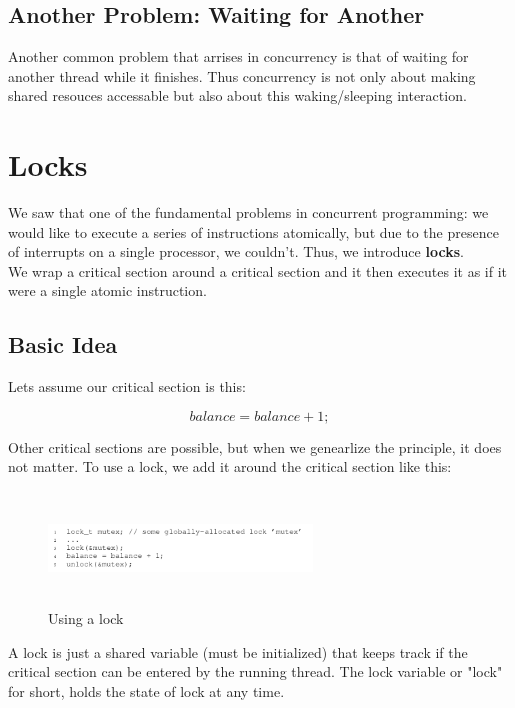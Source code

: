 \subsection{Another Problem: Waiting for Another}

Another common problem that arrises in concurrency is that of waiting for
another thread while it finishes. Thus concurrency is not only about making
shared resouces accessable but also about this waking/sleeping interaction.

\section{Locks}

We saw that one of the fundamental problems in concurrent programming: we would
like to execute a series of instructions atomically, but due to the presence of
interrupts on a single processor, we couldn't. Thus, we introduce \textbf{locks}.\\

We wrap a critical section around a critical section and it then executes it
as if it were a single atomic instruction.\\

\subsection{Basic Idea}

Lets assume our critical section is this:

$$
balance = balance + 1;
$$

Other critical sections are possible, but when we genearlize the principle, it
does not matter. To use a lock, we add it around the critical section like this:

\begin{figure}[h!]
    \begin{center}
        \includegraphics[width=7cm, height=3cm]{img/lockinit.png}
        \caption{Using a lock}
    \end{center}
\end{figure}

A lock is just a shared variable (must be initialized) that keeps track
if the critical section can be entered by the running thread. The lock variable
or "lock" for short, holds the state of lock at any time.\\

